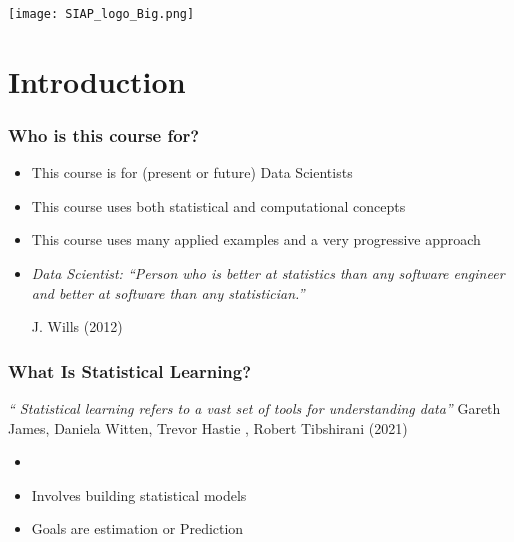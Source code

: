 \documentclass[xcolor=x11names,compress, aspectratio=169]{beamer}
\renewcommand{\(}{\begin{columns}}
\renewcommand{\)}{\end{columns}}
\newcommand{\<}[1]{\begin{column}{#1}}
\renewcommand{\>}{\end{column}}
\begin{document}
\begin{frame}
\Large{ \color{siap}{Machine Learning for Official Statistics and SDGs}}

\hspace{1cm}


\hspace{2cm}
\begin{center}

\texttt{[image: SIAP\_logo\_Big.png]}

\end{center}



\end{frame}

%


\section{Introduction}

\begin{frame} %
\frametitle{Who is this course for?}
\pause
\begin{itemize}[<+->]
  \item This course is for (present or future) Data Scientists
  \item This course uses both statistical and computational concepts
  \item This course uses many applied examples and a very progressive approach
  \item[]
\begin{center}
\emph{Data Scientist: “Person who is better at statistics than any software engineer and better at software than any statistician.” }
\end{center}
\scriptsize{J. Wills (2012)}
\end{itemize}
\end{frame}

\begin{frame} %
\frametitle{What Is Statistical Learning?}
\begin{center}
\emph{`` Statistical learning refers to a vast set of tools for understanding data''}
{\scriptsize Gareth James,  Daniela Witten, Trevor Hastie ,  Robert Tibshirani (2021)}
\end{center}
\begin{itemize}
 \item<+->[]
  \item<+->Involves building statistical models
  \item<+-> Goals are estimation or Prediction
 \end{itemize}
\end{frame}
\end{document}
